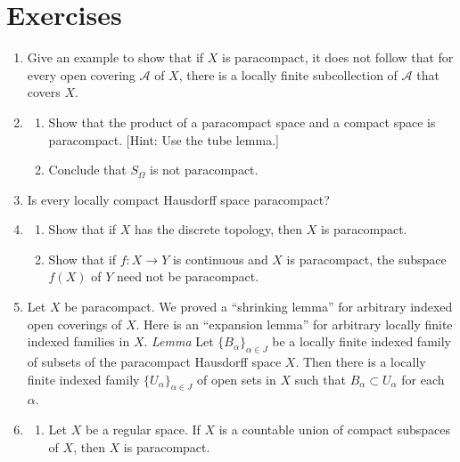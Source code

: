 \section*{Exercises}
\begin{enumerate}[itemsep=0.4em, parsep=0pt, topsep=0pt, partopsep=0pt, leftmargin=*, label=\arabic*., ref=\arabic*]
\item Give an example to show that if \(X\) is paracompact, it does not follow that for every open covering \(\mathcal{A}\) of \(X\), there is a locally finite subcollection of \(\mathcal{A}\) that covers \(X\).
\item
 \begin{enumerate}[itemsep=0.2em, parsep=0pt, topsep=0pt, partopsep=0pt, leftmargin=*, label=(\alph*), align=left]
 \item Show that the product of a paracompact space and a compact space is paracompact. [Hint: Use the tube lemma.]

 \item Conclude that \(S_{\Omega }\) is not paracompact.
 \end{enumerate}
\item Is every locally compact Hausdorff space paracompact?
\item
 \begin{enumerate}[itemsep=0.2em, parsep=0pt, topsep=0pt, partopsep=0pt, leftmargin=*, label=(\alph*), align=left]
 \item Show that if \(X\) has the discrete topology, then \(X\) is paracompact.

 \item Show that if \(f : X \rightarrow Y\) is continuous and \(X\) is paracompact, the subspace \(f(X)\) of \(Y\) need not be paracompact.
 \end{enumerate}
\item Let \(X\) be paracompact. We proved a ``shrinking lemma'' for arbitrary indexed open coverings of \(X\). Here is an ``expansion lemma'' for arbitrary locally finite indexed families in \(X\). \textsl{Lemma} Let \({\{ B_{\alpha }\} }_{\alpha \in J}\) be a locally finite indexed family of subsets of the paracompact Hausdorff space \(X\). Then there is a locally finite indexed family \({\{ U_{\alpha }\} }_{\alpha \in J}\) of open sets in \(X\) such that \(B_{\alpha } \subset {U}_{\alpha }\) for each \(\alpha\). 
\item
 \begin{enumerate}[itemsep=0.2em, parsep=0pt, topsep=0pt, partopsep=0pt, leftmargin=*, label=(\alph*), align=left]
 \item Let \(X\) be a regular space. If \(X\) is a countable union of compact subspaces of \(X\), then \(X\) is paracompact.


\end{enumerate}
\end{enumerate}
